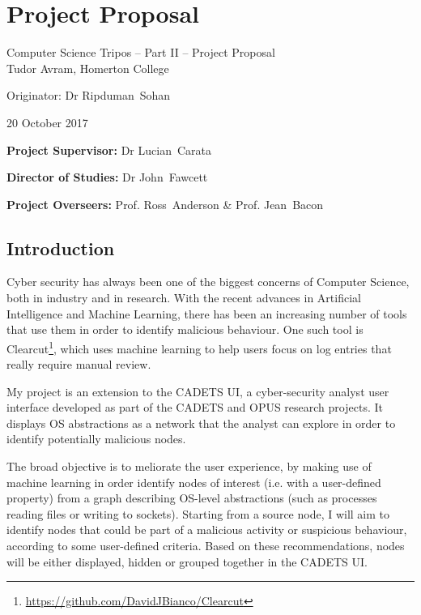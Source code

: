 \chapter{Project Proposal} \label{Appendix: Proposal}


\begin{center}
\Large
Computer Science Tripos -- Part II -- Project Proposal\\[4mm]

\large
Tudor Avram, Homerton College

Originator: Dr Ripduman~Sohan

20 October 2017
\end{center}

\vspace{5mm}

\textbf{Project Supervisor:} Dr Lucian~Carata

\textbf{Director of Studies:} Dr  John~Fawcett

\textbf{Project Overseers:} Prof. Ross~Anderson  \& Prof. Jean~Bacon


\section*{Introduction}

Cyber security has always been one of the biggest concerns of Computer Science, both in industry and in research. With the recent advances in Artificial Intelligence and Machine Learning, there has been an increasing number of tools that use them in order to identify malicious behaviour. One such tool is Clearcut\footnote{\url{https://github.com/DavidJBianco/Clearcut}}, which uses machine learning to help users focus on log entries that really require manual review. 

My project is an extension to the CADETS UI, a cyber-security analyst user interface developed as part of the CADETS and OPUS research projects. It displays OS abstractions as a network that the analyst can explore in order to identify potentially malicious nodes.

The broad objective is to meliorate the user experience, by making use of machine learning in order identify nodes of interest (i.e. with a user-defined property) from a graph describing OS-level abstractions (such as processes reading files or writing to sockets). Starting from a source node, I will aim to identify nodes that could be part of a malicious activity or suspicious behaviour, according to some user-defined criteria. Based on these recommendations, nodes will be either displayed, hidden or grouped together in the CADETS UI.

